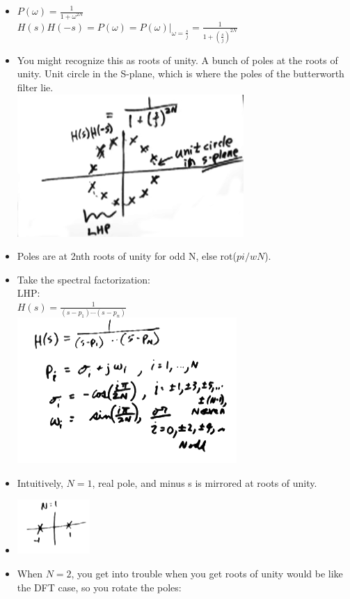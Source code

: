 \begin{itemize}
\item{
$P(\omega) = \frac{1}{1 + \omega^{2N}}$ \\
$H(s)H(-s) = P(\omega) = P(\omega) \vert_{\omega = \frac{s}{j}}
= \frac{1}{1 + (\frac{s}{j})^{2N}}
$ \\
}

\item{You might recognize this as roots of unity. A bunch of poles at the roots
of unity. Unit circle in the S-plane, which is where the poles of the butterworth
filter lie.
 \\
\includegraphics[scale=0.5]{frames/15e}
}

\item{Poles are at 2nth roots of unity for odd N, else rot($pi/wN$).}

\item{ Take the spectral factorization:  \\
LHP: \\
$H(s) = \frac{1}{(s - p_1) \cdots (s- p_n)}$
 \\
\includegraphics[scale=0.5]{frames/15g}
}

\item{Intuitively, $N =1$, real pole, and minus s is mirrored at roots of unity.}

\item{
\includegraphics[scale=0.9]{frames/15h}
}
\item{
When $N = 2$, you get into trouble when you get roots of unity would be like
the DFT case, so you rotate the poles:
}
  

\end{itemize}

